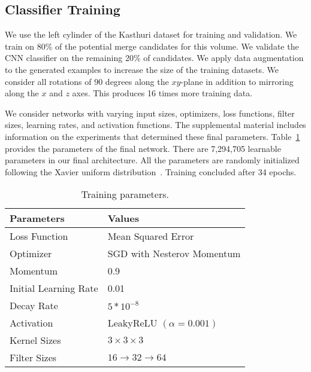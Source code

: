 
\subsection{Classifier Training}
\label{sec:network-parameters}

We use the left cylinder of the Kasthuri dataset for training and validation. We train on 80\% of the potential merge candidates for this volume.
We validate the CNN classifier on the remaining 20\% of candidates. We apply data augmentation to the generated examples to increase the size of the training datasets. We consider all rotations of $90$ degrees along the $xy$-plane in addition to mirroring along the $x$ and $z$ axes. This produces 16 times more training data.

We consider networks with varying input sizes, optimizers, loss functions, filter sizes, learning rates, and activation functions. The supplemental material includes information on the experiments that determined these final parameters. Table~\ref{table:architecture} provides the parameters of the final network. There are 7,294,705 learnable parameters in our final architecture. All the parameters are randomly initialized following the Xavier uniform distribution~\cite{glorot2010understanding}. Training concluded after 34 epochs.

\begin{table}[h!]
	\centering
	\begin{tabular}{l l} \hline
		\textbf{Parameters} & \textbf{Values} \\ \hline
		Loss Function & Mean Squared Error \\
		Optimizer & SGD  with Nesterov Momentum \\
		Momentum & 0.9 \\
		Initial Learning Rate & 0.01 \\
		Decay Rate & $5 * 10^{-8}$ \\
		Activation & LeakyReLU $(\alpha = 0.001)$ \\
		Kernel Sizes & $3 \times 3 \times 3$ \\
		Filter Sizes & $16 \to 32 \to 64$ \\ \hline
	\end{tabular}
	\caption{Training parameters.}
	\label{table:architecture}
\end{table}

